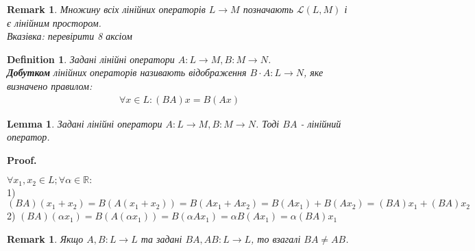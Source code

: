 \documentclass[a4paper, 10pt]{article}
\makeatletter
\def\qed{$\blacksquare$}
\theoremstyle{theoremdd}
\theoremstyle{theoremdd}
\newtheorem{definition}[theorem]{Definition}
\theoremstyle{theoremdd}
\theoremstyle{theoremdd}
\theoremstyle{theoremdd}
\theoremstyle{theoremdd}
\newtheorem{remark}[theorem]{Remark}
\theoremstyle{theoremdd}
\newtheorem{lemma}[theorem]{Lemma}
\theoremstyle{theoremdd}
\renewenvironment{proof}[1][Proof.\\]{\par
\pushQED{\hfill \qed}%
\normalfont \topsep6\p@\@plus6\p@\relax
\trivlist
\item\relax
{\bfseries
#1\@addpunct{.}}\hspace\labelsep\ignorespaces
}{%
\popQED\endtrivlist\@endpefalse
}
\makeatother
\begin{document}
	\begin{remark}
	Множину всіх лінійних операторів $L \to M$ позначають $\mathcal{L}(L,M)$ і є лінійним простором.\\
	\textit{Вказівка: перевірити 8 аксіом}
	\end{remark}
	
	\begin{definition}
	Задані лінійні оператори $A: L \to M, B: M \to N$.\\
	\textbf{Добутком} лінійних операторів називають відображення $B\cdot A: L \to N$, яке визначено правилом:
	\begin{align*}
	\forall x \in L: (BA)x = B(Ax)
	\end{align*}
	\end{definition}
	
	\begin{lemma}
	Задані лінійні оператори $A: L \to M, B: M \to N$. Тоді $BA$ - лінійний оператор.
	\end{lemma}
	
	\begin{proof}
	$\forall x_1, x_2 \in L; \forall \alpha \in \mathbb{R}:$\\
	1) $(BA)(x_1+x_2) = B(A(x_1+x_2)) = B(Ax_1+Ax_2)=B(Ax_1) + B(Ax_2)=(BA)x_1+(BA)x_2$\\
	2) $(BA)(\alpha x_1) = B(A(\alpha x_1)) = B(\alpha Ax_1) = \alpha B(Ax_1) = \alpha (BA)x_1$
	\end{proof}
	
	\begin{remark}
	Якщо $A,B: L \to L$ та задані $BA, AB: L \to L$, то взагалі $BA \neq AB$.
	\end{remark}
	
\end{document}
